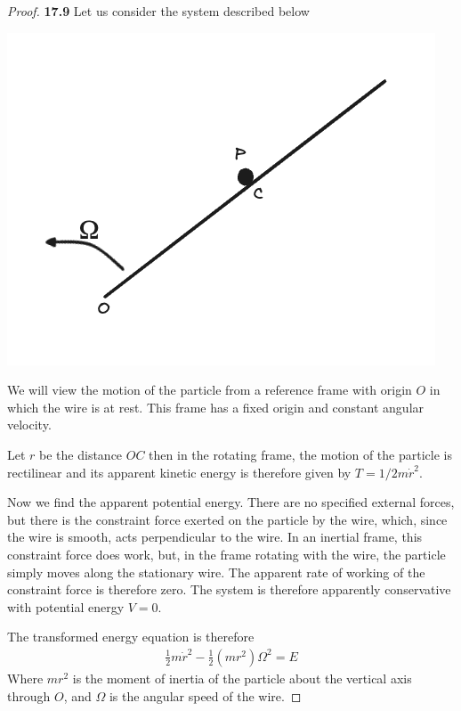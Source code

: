 \documentclass[11pt]{article}
\theoremstyle{definition}
\begin{document}
\begin{proof}{\textbf{17.9}}
    Let us consider the system described below
    \begin{center}
        \includegraphics[scale=0.4]{ch17-9.png}
    \end{center}
    We will view the motion of the particle from a reference frame with origin
    $O$ in which the wire is at rest.
    This frame has a fixed origin and constant angular velocity.
    
    Let $r$ be the distance $OC$ then in the rotating frame, the motion of the
    particle is rectilinear and its apparent kinetic energy is therefore 
    given by $T = 1/2m\dot r^2$.

    Now we find the apparent potential energy. There are no specified external
    forces, but there is the constraint force exerted on the particle by the
    wire, which, since the wire is smooth, acts perpendicular to the wire.
    In an inertial frame, this constraint force does work, but, in the frame
    rotating with the wire, the particle simply moves along the stationary
    wire. The apparent rate of working of the constraint force is therefore
    zero. The system is therefore apparently conservative with potential energy
    $V=0$.

    The transformed energy equation is therefore
    \begin{align*}
        \frac{1}{2}m\dot r^2 - \frac{1}{2}(mr^2)\Omega^2 = E 
    \end{align*}
    Where $mr^2$ is the moment of inertia of the particle about the vertical
    axis through $O$, and $\Omega$ is the angular speed of the wire.


\end{proof}
\end{document}
